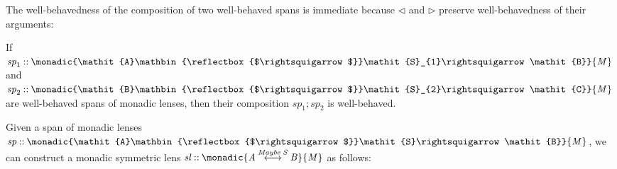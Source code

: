 \documentclass[runningheads]{llncs}
\newcommand{\Conid}[1]{\mathit{#1}}
\newcommand{\Varid}[1]{\mathit{#1}}
\begin{document}
The well-behavedness of the composition of two well-behaved spans is
immediate because \ensuremath{\triangleleft} and \ensuremath{\triangleright} preserve well-behavedness of their arguments:
\begin{theorem}
  If \ensuremath{\Varid{sp}_{\mathrm{1}}\mathbin{::}\monadic{\Conid{A}\mathbin{\reflectbox{$\rightsquigarrow$}}\Conid{S}_{1}\rightsquigarrow\Conid{B}}{\Conid{M}}} and \ensuremath{\Varid{sp}_{\mathrm{2}}\mathbin{::}\monadic{\Conid{B}\mathbin{\reflectbox{$\rightsquigarrow$}}\Conid{S}_{2}\rightsquigarrow\Conid{C}}{\Conid{M}}}
  are well-behaved spans of monadic lenses, then their composition
  \ensuremath{\Varid{sp}_{\mathrm{1}}\mathbin{;}\Varid{sp}_{\mathrm{2}}} is well-behaved.
\end{theorem}






















Given a span of monadic lenses \ensuremath{\Varid{sp}\mathbin{::}\monadic{\Conid{A}\mathbin{\reflectbox{$\rightsquigarrow$}}\Conid{S}\rightsquigarrow\Conid{B}}{\Conid{M}}},
we can  construct a monadic symmetric lens \ensuremath{\Varid{sl}\mathbin{::}\monadic{\Conid{A}\mathbin{\overset{\Conid{Maybe}\;\Conid{S}}{\longleftrightarrow}}\Conid{B}}{\Conid{M}}}  as follows:
\end{document}
